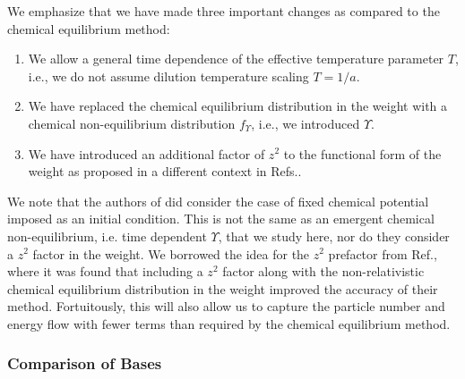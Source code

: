 We emphasize that we have made three important changes as compared to  the chemical equilibrium method:
\begin{enumerate}
\item  We allow a general time dependence of the effective temperature parameter $T$, i.e., we do not assume dilution temperature scaling $T=1/a$.
\item We have replaced the chemical  equilibrium distribution in the weight   with a chemical non-equilibrium distribution  $f_\Upsilon $, i.e., we introduced $\Upsilon$.
\item We have introduced an additional factor of $z^2$ to the functional form of the weight as proposed in a different context in Refs.\cite{Wilkening,Wilkening2}. 
\end{enumerate} 
We note that the authors of \cite{Esposito2000} did consider the case of fixed chemical potential imposed as an initial condition. This is not the same as an emergent chemical non-equilibrium, i.e. time dependent $\Upsilon$, that we study here, nor do they consider a $z^2$ factor in the weight. We borrowed the idea for the $z^2$ prefactor from   Ref.\cite{Wilkening2}, where it was found that including a $z^2$ factor along with the non-relativistic chemical equilibrium distribution in the weight improved the accuracy of their method. Fortuitously,  this will also allow us to capture the particle number and energy flow with fewer terms than required by the chemical equilibrium method. 

\subsubsection{Comparison of Bases}\label{basis_comparison}

